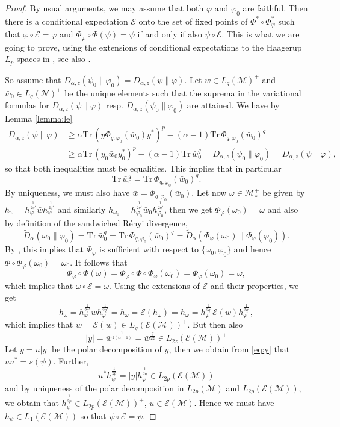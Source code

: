 \documentclass[12pt]{article}
\theoremstyle{definition}
\theoremstyle{remark}
\def\Me{\mathcal M}
\def\Ee{\mathcal E}
\def\Ne{\mathcal N}
\def \Tr{\mathrm{Tr}\,}
\begin{document}
\begin{proof} By usual arguments, we may assume that both $\varphi$ and $\varphi_0$ are
faithful. Then there is a  conditional expectation $\Ee$ onto the set of fixed points of
$\Phi^*\circ\Phi_\varphi^*$ such that $\varphi\circ \Ee=\varphi$ and  
$\Phi_\varphi\circ\Phi(\psi)=\psi$ if and only if also $\psi\circ \Ee$. This is what we
are going to prove, using the extensions of conditional expectations to the Haagerup
$L_p$-spaces in \cite{junge2003noncommutative}, see also \cite[Sec. 1]{AJnote3}. 

So assume that $D_{\alpha,z}(\psi_0\|\varphi_0)=D_{\alpha,z}(\psi\|\varphi)$. Let $\bar
w\in L_q(\Me)^+$ and $\bar w_0\in L_q(\Ne)^+$ be the unique elements such that the suprema
in the variational formulas for $D_{\alpha,z}(\psi\|\varphi)$ resp.
$D_{\alpha,z}(\psi_0\|\varphi_0)$ are attained. We have by Lemma \ref{lemma:le}
\begin{align*}
D_{\alpha,z}(\psi\|\varphi)&\ge \alpha\Tr(y\Phi_{q,\varphi_0}(\bar w_0)y^*)^p-(\alpha-1)\Tr
\Phi_{q,\varphi_0}(\bar w_0)^q\\
&\ge \alpha\Tr(y_0\bar w_0 y_0^*)^p-(\alpha-1)\Tr \bar
w_0^q=D_{\alpha,z}(\psi_0\|\varphi_0)=D_{\alpha,z}(\psi\|\varphi),
\end{align*}
so that both inequalities must be equalities. This implies that in particular
\[
\Tr \bar w_0^q=\Tr \Phi_{q,\varphi_0}(\bar w_0)^q.
\]
By uniqueness, we must also have  $\bar w=\Phi_{q,\varphi_0}(\bar w_0)$. Let now $\omega\in \Me_*^+$ be given by
$h_{\omega}=h_\varphi^{\frac1{2q'}}\bar wh_\varphi^{\frac1{2q'}}$ and similarly
$h_{\omega_0}=h_{\varphi_0}^{\frac1{2q'}}\bar w_0h_{\varphi_0}^{\frac1{2q'}}$, then 
we get  $\Phi_\varphi(\omega_0)=\omega$ and also by
definition of the sandwiched R\'enyi divergence,
\[
\tilde D_\alpha(\omega_0\|\varphi_0)=\Tr \bar w_0^q=\Tr \Phi_{q,\varphi_0}(\bar
w_0)^q=\tilde D_\alpha(\Phi_\varphi(\omega_0)\|\Phi_\varphi(\varphi_0)).
\]
By \cite{jencova2018renyi}, this implies that $\Phi_\varphi$ is sufficient with respect to
$\{\omega_0,\varphi_0\}$ and hence $\Phi\circ\Phi_\varphi(\omega_0)=\omega_0$. It follows
that
\[
\Phi_\varphi\circ\Phi(\omega)=\Phi_\varphi\circ \Phi\circ
\Phi_\varphi(\omega_0)=\Phi_\varphi(\omega_0)=\omega,
\]
which implies that $\omega\circ \Ee=\omega$. Using the extensions of $\Ee$ and their
properties, we get
\[
h_{\omega}=h_\varphi^{\frac1{2q'}}\bar
wh_\varphi^{\frac1{2q'}}=h_\omega=\Ee(h_\omega)=h_{\omega}=h_\varphi^{\frac1{2q'}}\Ee(\bar
w)h_\varphi^{\frac1{2q'}},
\]
which implies that $\bar w=\Ee(\bar w)\in L_q(\Ee(\Me))^+$. But then also 
\[
|y|=\bar w^{\frac1{2(\alpha-1)}}=\bar w^{\frac{q}{2z}}\in L_{2z}(\Ee(\Me))^+
\]
Let $y=u|y|$ be the polar decomposition of $y$, then we obtain from \eqref{eq:y} that
$uu^*=s(\psi)$. Further,
\[
u^*h_\psi^{\frac1{2p}}=|y|h_\varphi^{\frac1{2q}}\in L_{2p}(\Ee(\Me))
\]
and by uniqueness of the polar decomposition in $L_{2p}(\Me)$ and $L_{2p}(\Ee(\Me))$, we
obtain that $h_{\psi}^{\frac1{2p}}\in L_{2p}(\Ee(\Me))^+$, $u\in \Ee(\Me)$. Hence we must
have $h_\psi\in L_1(\Ee(\Me))$ so that $\psi\circ\Ee=\psi$.


\end{proof}
\end{document}
